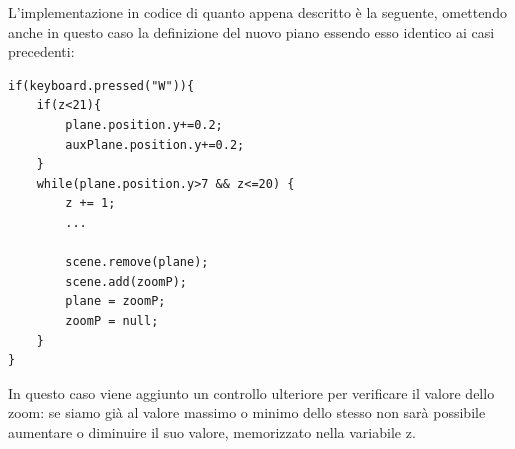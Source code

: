 L'implementazione in codice di quanto appena descritto è la seguente, omettendo anche in questo caso la definizione del nuovo piano essendo esso identico ai casi precedenti:
\begin{verbatim}
if(keyboard.pressed("W")){
    if(z<21){
        plane.position.y+=0.2;
        auxPlane.position.y+=0.2;
    }
    while(plane.position.y>7 && z<=20) {
        z += 1;
        ...

        scene.remove(plane);
        scene.add(zoomP);
        plane = zoomP;
        zoomP = null;
    }
}
\end{verbatim}
In questo caso viene aggiunto un controllo ulteriore per verificare il valore dello zoom: se siamo già al valore massimo o minimo dello stesso non sarà possibile aumentare o diminuire il suo valore, memorizzato nella variabile z.